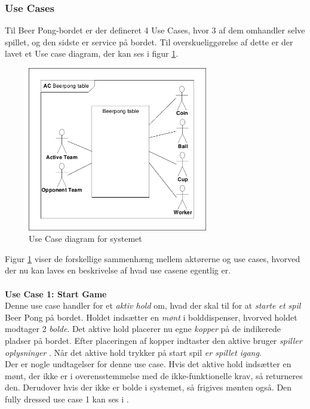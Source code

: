 \documentclass[Rapport/Rapport_main.tex]{subfiles}
\begin{document}
\subsubsection{Use Cases} \label{sec:rap_use_cases}
Til Beer Pong-bordet er der defineret 4 Use Cases, hvor 3 af dem omhandler selve spillet, og den sidste er service på bordet. Til overskueliggørelse af dette er der lavet et Use case diagram, der kan ses i figur \ref{fig:rap_uc_diagram}.
\begin{figure}[H]
    \centering
    \includegraphics[width=0.7\textwidth,trim={0.24in 0.24in 0.24in 0.24in},clip, page=2]{Kravspecifikation/Funktionelle_krav/graphics_funktionel/Krav-spec-diagrammer.pdf}
    \caption{Use Case diagram for systemet}
    \label{fig:rap_uc_diagram}
\end{figure}
Figur \ref{fig:rap_uc_diagram} viser de forskellige sammenhæng mellem aktørerne og use cases, hvorved der nu kan laves en beskrivelse af hvad use casene egentlig er. \\\\
\textbf{Use Case 1: Start Game}\\
Denne use case handler for et \textit{aktiv hold} om, hvad der skal til for at \textit{starte et spil} Beer Pong på bordet. Holdet indsætter en \textit{mønt} i bolddispenser, hvorved holdet modtager 2 \textit{bolde}. Det aktive hold placerer nu egne \textit{kopper} på de indikerede pladser på bordet. Efter placeringen af kopper indtaster den aktive bruger \textit{spiller oplysninger} . Når det aktive hold trykker på start spil \textit{er spillet igang}.\\
Der er nogle undtagelser for denne use case. Hvis det aktive hold indsætter en mønt, der ikke er i overensstemmelse med de ikke-funktionelle krav, så returneres den. Derudover hvis der ikke er bolde i systemet, så frigives mønten også. Den fully dressed use case 1 kan ses i .\\\\
\end{document}
